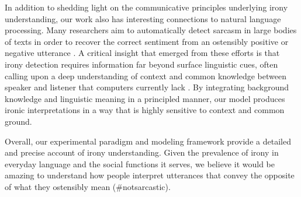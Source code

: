 \documentclass[10pt,letterpaper]{article}
\begin{document}
In addition to shedding light on the communicative principles underlying irony understanding, our work also has interesting connections to natural language processing. Many researchers aim to automatically detect sarcasm in large bodies of texts in order to recover the correct sentiment from an ostensibly positive or negative utterance 
\cite{davidov2010semi, filatova2012irony}. A critical insight that emerged from these efforts is that irony detection requires information far beyond surface linguistic cues, often calling upon a deep understanding of context and common knowledge between speaker and listener that computers currently lack \cite{gonzalez2011identifying, wallacehumans}. By integrating background knowledge and linguistic meaning in a principled manner, our model produces ironic interpretations in a way that is highly sensitive to context and common ground. 

Overall, our experimental paradigm and modeling framework provide a detailed and precise account of irony understanding. Given the prevalence of irony in everyday language and the social functions it serves, we believe it would be amazing to understand how people interpret utterances that convey the opposite of what they ostensibly mean ($\#$notsarcastic). 

%
%



\end{document}

